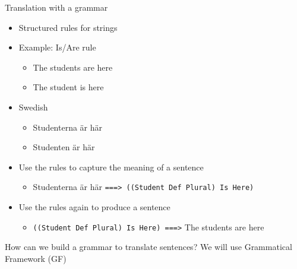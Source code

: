 \begin{frame}{Translation with a grammar} 
         \begin{itemize}
		   \item Structured rules for strings \pause
           \item Example: Is/Are rule \pause
           \begin{itemize}
             \item The students \textcolor{String}{are} here
             \item The student \textcolor{String}{is} here \pause
           \end{itemize}             
           \item Swedish
           \begin{itemize}
             \item Studenterna \textcolor{String}{{\"a}r} h{\"a}r
             \item Studenten \textcolor{String}{{\"a}r} h{\"a}r \pause
           \end{itemize}\pause
           \item Use the rules to capture the meaning of a sentence\pause
           \begin{itemize}
             \item Studenterna {\"a}r h{\"a}r \texttt{===> ((Student Def Plural) Is Here)}\pause
           \end{itemize}
           \item Use the rules again to produce a sentence \pause
           \begin{itemize}
             \item \texttt{((Student Def Plural) Is Here) ===>} The students are here \pause
           \end{itemize}
         \end{itemize}
           \begin{block}{How can we build a grammar to translate sentences?}
              We will use Grammatical Framework (GF)
         \end{block}
\end{frame}

